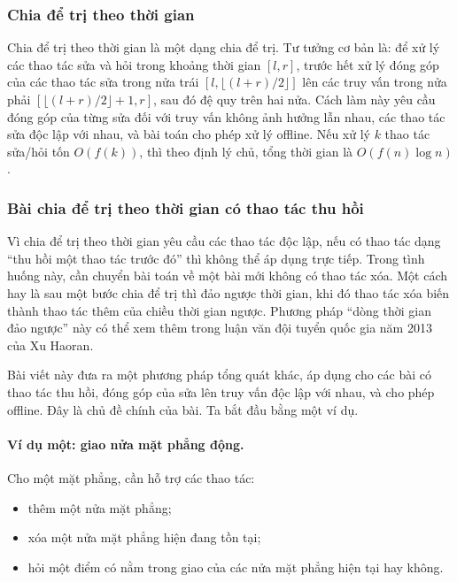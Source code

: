 \documentclass[11pt]{article}
\begin{document}
\subsubsection{Chia để trị theo thời gian}

Chia để trị theo thời gian là một dạng chia để trị. Tư tưởng cơ bản là: để xử
lý các thao tác sửa và hỏi trong khoảng thời gian \([l,r]\), trước hết xử lý
đóng góp của các thao tác sửa trong nửa trái
\([l,\lfloor(l+r)/2\rfloor]\) lên các truy vấn trong nửa phải
\([\lfloor(l+r)/2\rfloor+1,r]\), sau đó đệ quy trên hai nửa. Cách làm này yêu
cầu đóng góp của từng sửa đối với truy vấn không ảnh hưởng lẫn nhau, các thao
tác sửa độc lập với nhau, và bài toán cho phép xử lý offline. Nếu xử lý \(k\)
thao tác sửa/hỏi tốn \(O(f(k))\), thì theo định lý chủ, tổng thời gian là
\(O(f(n)\log n)\).

\subsubsection{Bài chia để trị theo thời gian có thao tác thu hồi}

Vì chia để trị theo thời gian yêu cầu các thao tác độc lập, nếu có thao tác
dạng ``thu hồi một thao tác trước đó'' thì không thể áp dụng trực tiếp. Trong
tình huống này, cần chuyển bài toán về một bài mới không có thao tác xóa. Một
cách hay là sau một bước chia để trị thì đảo ngược thời gian, khi đó thao tác
xóa biến thành thao tác thêm của chiều thời gian ngược. Phương pháp ``dòng
thời gian đảo ngược'' này có thể xem thêm trong luận văn đội tuyển quốc gia
năm 2013 của Xu Haoran.

Bài viết này đưa ra một phương pháp tổng quát khác, áp dụng cho các bài có
thao tác thu hồi, đóng góp của sửa lên truy vấn độc lập với nhau, và cho phép
offline. Đây là chủ đề chính của bài. Ta bắt đầu bằng một ví dụ.

\paragraph{Ví dụ một: giao nửa mặt phẳng động.}
Cho một mặt phẳng, cần hỗ trợ các thao tác:
\begin{itemize}
  \item thêm một nửa mặt phẳng;
  \item xóa một nửa mặt phẳng hiện đang tồn tại;
  \item hỏi một điểm có nằm trong giao của các nửa mặt phẳng hiện tại hay
  không.
\end{itemize}
\end{document}
